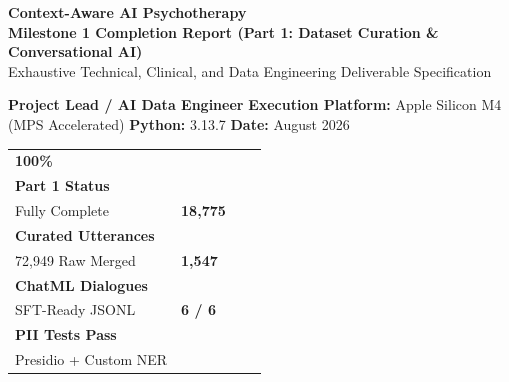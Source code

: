 \documentclass[11pt,a4paper]{article}
\begin{document}
\begin{center}
  {\sffamily\Huge\bfseries\color{navyblue} Context-Aware AI Psychotherapy}\\[0.4em]
  {\sffamily\Large\bfseries\color{clinicalteal} Milestone 1 Completion Report (Part 1: Dataset Curation \& Conversational AI)}\\[0.3em]
  {\sffamily\normalsize\color{darkcharcoal} Exhaustive Technical, Clinical, and Data Engineering Deliverable Specification}\\[1em]
  
  \begin{tcolorbox}[enhanced, colback=softgray, colframe=bordergray, boxrule=0.8pt, width=\linewidth, arc=3mm]
    \centering\sffamily\small
    \textbf{Project Lead / AI Data Engineer} \quad\textbar\quad
    \textbf{Execution Platform:} Apple Silicon M4 (MPS Accelerated) \quad\textbar\quad
    \textbf{Python:} 3.13.7 \quad\textbar\quad
    \textbf{Date:} August 2026
  \end{tcolorbox}
\end{center}

\vspace{0.5em}

\begin{tcolorbox}[metricCard]
\begin{center}
\begin{tabularx}{\linewidth}{XXXX}
  \centering
  {\Huge\bfseries\color{clinicalteal} 100\%}\\[0.2em]
  {\sffamily\small\textbf{Part 1 Status}}\\[0.1em]
  {\sffamily\scriptsize\color{gray} Fully Complete}
  &
  \centering
  {\Huge\bfseries\color{primaryblue} 18,775}\\[0.2em]
  {\sffamily\small\textbf{Curated Utterances}}\\[0.1em]
  {\sffamily\scriptsize\color{gray} 72,949 Raw Merged}
  &
  \centering
  {\Huge\bfseries\color{accentcoral} 1,547}\\[0.2em]
  {\sffamily\small\textbf{ChatML Dialogues}}\\[0.1em]
  {\sffamily\scriptsize\color{gray} SFT-Ready JSONL}
  &
  \centering
  {\Huge\bfseries\color{successgreen} 6 / 6}\\[0.2em]
  {\sffamily\small\textbf{PII Tests Pass}}\\[0.1em]
  {\sffamily\scriptsize\color{gray} Presidio + Custom NER}
\end{tabularx}
\end{center}
\end{tcolorbox}
\end{document}
